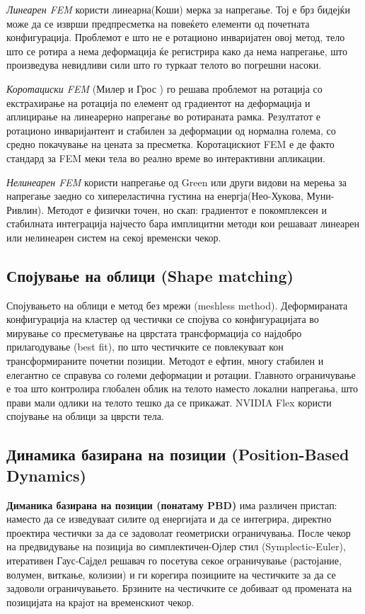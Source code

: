 \textit{Линеарен FEM} користи линеарна(Коши) мерка за напрегање. Тој е брз бидејќи може да се изврши предпресметка на повеќето елементи од почетната конфигурација. Проблемот е што не е ротационо инваријатен овој метод, тело што се ротира а нема деформација ќе регистрира како да нема напрегање, што произведува невидливи сили што го туркаат телото во погрешни насоки.

\textit{Коротациски FEM} (Милер и Грос \cite{MullerAndGross}) го решава проблемот на ротација со екстрахирање на ротација по елемент од градиентот на деформација и аплицирање на линеарерно напрегање во ротираната рамка. Резултатот е ротационо инваријантент и стабилен за деформации од нормална голема, со средно покачување на цената за пресметка. Коротацискиот FEM е де факто стандард за FEM меки тела во реално време во интерактивни апликации.

\textit{Нелинеарен FEM} користи напрегање од Green или други видови на мерења за напрегање заедно со хипереластична густина на енергја(Нео-Хукова, Муни-Ривлин). Методот е физички точен, но скап: градиентот е покомплексен и стабилната интеграција најчесто бара имплицитни методи кои решаваат линеарен или нелинеарен систем на секој временски чекор.

\subsection{Спојување на облици (Shape matching)}
Спојувањето на облици \cite{MullerAndGross} е метод без мрежи (meshless method). Деформираната конфигурација на кластер од честички се спојува со конфигурацијата во мирување со пресметување на цврстата трансформација со најдобро прилагодување (best fit), по што честичките се повлекуваат кон трансформираните почетни позиции. Методот е ефтин, многу стабилен и елегантно се справува со големи деформации и ротации. Главното ограничување е тоа што контролира глобален облик на телото наместо локални напрегања, што прави мали одлики на телото тешко да се прикажат. NVIDIA Flex користи спојување на облици за цврсти тела.

\subsection{Динамика базирана на позиции (Position-Based Dynamics)}
\textbf{Диманика базирана на позиции (понатаму PBD)}\cite{pbd} има различен пристап: наместо да се изведуваат силите од енергијата и да се интегрира, директно проектира честички за да се задоволат геометриски ограничувања. После чекор на предвидување на позиција во симплектичен-Ојлер стил (Symplectic-Euler), итеративен Гаус-Сајдел решавач го посетува секое ограничување (растојание, волумен, виткање, колизии) и ги корегира позициите на честичките за да се задоволи ограничувањето. Брзините на честичките се добиваат од промената на позицијата на крајот на временскиот чекор.

